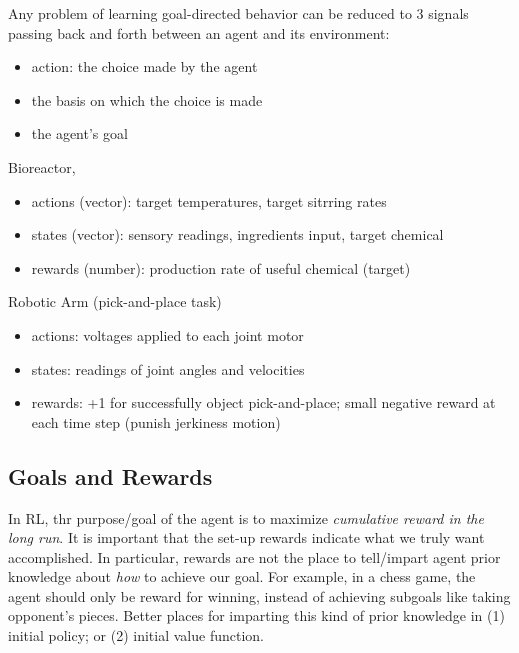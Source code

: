 \documentclass[lang=en,mode=geye,device=normal,color=blue,14pt]{elegantnote}
\DeclareMathOperator*{\1}{\mathbbm{1}}
\begin{document}
Any problem of learning goal-directed behavior can be reduced to 3 signals passing back and forth between an agent and its environment:
\begin{itemize}
\item action: the choice made by the agent
\item the basis on which the choice is made
\item the agent's goal
\end{itemize}

\begin{example}
Bioreactor,

\begin{itemize}
\item actions (vector): target temperatures, target sitrring rates
\item states (vector): sensory readings, ingredients input, target chemical
\item rewards (number): production rate of useful chemical (target)
\end{itemize}

\end{example}

\begin{example}
Robotic Arm (pick-and-place task)

\begin{itemize}
\item actions: voltages applied to each joint motor
\item states: readings of joint angles and velocities
\item rewards: +1 for successfully object pick-and-place; small negative reward at each time step (punish jerkiness motion)
\end{itemize}
\end{example}


\subsection{Goals and Rewards}
 In RL, thr purpose/goal of the agent is to maximize \textit{cumulative reward in the long run}.
 It is important that the set-up rewards indicate what we truly want accomplished.
 In particular, rewards are not the place to tell/impart agent prior knowledge about \textit{how} to achieve our goal.
 For example, in a chess game, the agent should only be reward for winning, instead of achieving subgoals like taking opponent's pieces.
 Better places for imparting this kind of prior knowledge in (1) initial policy; or (2) initial value function.
 
\end{document}
